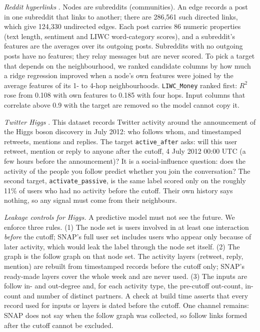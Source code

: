\textit{Reddit hyperlinks} \citep{kumar2018}. Nodes are subreddits (communities). An edge records a post in one subreddit that links to another; there are 286,561 such directed links, which give 124,330 undirected edges. Each post carries 86 numeric properties (text length, sentiment and LIWC word-category scores), and a subreddit's features are the averages over its outgoing posts. Subreddits with no outgoing posts have no features; they relay messages but are never scored. To pick a target that depends on the neighbourhood, we ranked candidate columns by how much a ridge regression improved when a node's own features were joined by the average features of its 1- to 4-hop neighbourhoods. \texttt{LIWC\_Money} ranked first: $R^2$ rose from 0.108 with own features to 0.185 with four hops. Input columns that correlate above 0.9 with the target are removed so the model cannot copy it.

\textit{Twitter Higgs} \citep{f_dedomenico2013}. This dataset records Twitter activity around the announcement of the Higgs boson discovery in July 2012: who follows whom, and timestamped retweets, mentions and replies. The target \texttt{active\_after} asks: will this user retweet, mention or reply to anyone after the cutoff, 4 July 2012 00:00 UTC (a few hours before the announcement)? It is a social-influence question: does the activity of the people you follow predict whether you join the conversation? The second target, \texttt{activate\_passive}, is the same label scored only on the roughly 11\% of users who had no activity before the cutoff. Their own history says nothing, so any signal must come from their neighbours.

\textit{Leakage controls for Higgs.} A predictive model must not see the future. We enforce three rules. (1) The node set is users involved in at least one interaction \emph{before} the cutoff; SNAP's full user set includes users who appear only because of later activity, which would leak the label through the node set itself. (2) The graph is the follow graph on that node set. The activity layers (retweet, reply, mention) are rebuilt from timestamped records before the cutoff only; SNAP's ready-made layers cover the whole week and are never used. (3) The inputs are follow in- and out-degree and, for each activity type, the pre-cutoff out-count, in-count and number of distinct partners. A check at build time asserts that every record used for inputs or layers is dated before the cutoff. One channel remains: SNAP does not say when the follow graph was collected, so follow links formed after the cutoff cannot be excluded.

